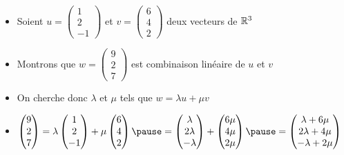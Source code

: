 \begin{frame}
\begin{exemple}
\begin{itemize}
  \item Soient $u = \left(\begin{smallmatrix}1\\ 2\\ -1\end{smallmatrix}\right)$ et $v =
   \left(\begin{smallmatrix}6\\4\\2\end{smallmatrix}\right)$ deux vecteurs de $\mathbb{R}^3$

   \pause
   
  \item  Montrons que $w =
   \left(\begin{smallmatrix}9\\ 2\\ 7\end{smallmatrix}\right)$ est combinaison linéaire de $u$ et $v$
  
  \pause
  
  \item On cherche donc $\lambda$ et $\mu$ tels que $w=\lambda u + \mu v$
  
  \pause
  
  \item $\left(\begin{matrix}9\\2\\7\end{matrix}\right) 
 =  \lambda \left(\begin{matrix}1\cr 2\cr -1\end{matrix}\right) + \mu \left(\begin{matrix}6\\4\\2\end{matrix}\right)
 \pause
 =  \left(\begin{matrix}\lambda\\ 2\lambda\\ -\lambda\end{matrix}\right) 
     + \left(\begin{matrix}6\mu\\ 4\mu\\ 2\mu\end{matrix}\right)
 \pause
 =  \left(\begin{matrix}\lambda + 6\mu\\ 2\lambda + 4\mu\\ -\lambda + 2\mu\end{matrix}\right)$  
  

\end{itemize}
\end{exemple}
\end{frame}
